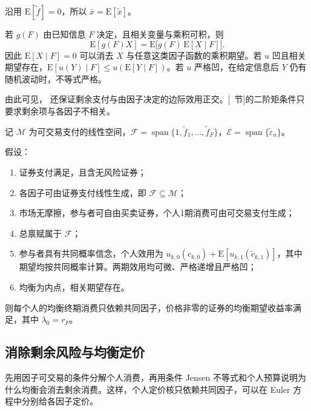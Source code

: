 沿用 $\mathrm E[\widetilde f]=0$，所以 $\bar x=\mathrm E[\widetilde x]$。

\begin{tcolorbox}[knowledge,title={条件期望、迭代期望与条件 Jensen 不等式}]
若 $g(F)$ 由已知信息 $F$ 决定，且相关变量与乘积可积，则
\[
 \mathrm E[g(F)X]=\mathrm E\bigl[g(F)\,\mathrm E[X\mid F]\bigr].
\]
因此 $\mathrm E[X\mid F]=0$ 可以消去 $X$ 与任意这类因子函数的乘积期望。若 $u$ 凹且相关期望存在，$\mathrm E[u(Y)\mid F]\le u(\mathrm E[Y\mid F])$。若 $u$ 严格凹，在给定信息后 $Y$ 仍有随机波动时，不等式严格。
\end{tcolorbox}

由此可见， 还保证剩余支付与由因子决定的边际效用正交。[~节]的二阶矩条件只要求剩余项与各因子不相关。

记 $\mathcal M$ 为可交易支付的线性空间，$\mathcal F=\operatorname{span}\{1,\widetilde f_1,\ldots,\widetilde f_F\}$，$\mathcal E=\operatorname{span}\{\widetilde\varepsilon_n\}$。
\begin{tcolorbox}[knowledge]
 假设：
\begin{enumerate}
 \item 证券支付满足，且含无风险证券；
 \item 各因子可由证券支付线性生成，即 $\mathcal F\subseteq\mathcal M$；
 \item 市场无摩擦，参与者可自由买卖证券，个人1期消费可由可交易支付生成；
 \item 总禀赋属于 $\mathcal F$；
 \item 参与者具有共同概率信念，个人效用为 $u_{k,0}(c_{k,0})+\mathrm E[u_{k,1}(\widetilde c_{k,1})]$，其中期望均按共同概率计算。两期效用均可微、严格递增且严格凹；
 \item 均衡为内点，相关期望存在。
\end{enumerate}
则每个人的均衡终期消费只依赖共同因子，价格非零的证券的均衡期望收益率满足，其中 $\lambda_0=r_F$。
\end{tcolorbox}

\subsection{消除剩余风险与均衡定价}
先用因子可交易的条件分解个人消费，再用条件 Jensen 不等式和个人预算说明为什么均衡会消去剩余消费。这样，个人定价核只依赖共同因子，可以在 Euler 方程中分别给各因子定价。

